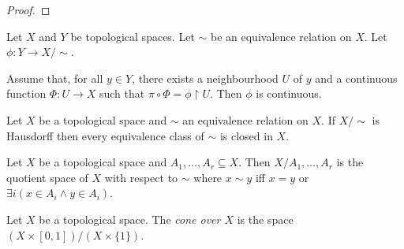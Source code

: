 \begin{proof}
\pf
{}
\end{proof}


\begin{prop}
Let $X$ and $Y$ be topological spaces. Let $\sim$ be an equivalence relation on $X$. Let $\phi : Y \rightarrow X / \sim$.

Assume that, for all $y \in Y$, there exists a neighbourhood $U$ of $y$ and a continuous function $\Phi : U \rightarrow X$ such that $\pi \circ \Phi = \phi \restriction U$. Then $\phi$ is continuous.
\end{prop}

\begin{prop}
Let $X$ be a topological space and $\sim$ an equivalence relation on $X$. If $X / \sim$ is Hausdorff then every equivalence class of $\sim$ is closed in $X$.
\end{prop}

\begin{df}
Let $X$ be a topological space and $A_1, \ldots, A_r \subseteq X$. Then $X / A_1, \ldots, A_r$ is the quotient space of $X$ with respect to $\sim$ where $x \sim y$ iff $x = y$ or $\exists i (x \in A_i \wedge y \in A_i)$.
\end{df}

\begin{df}[Cone]
Let $X$ be a topological space. The \emph{cone over $X$} is the space $(X \times [0,1]) / (X \times \{1\})$.
\end{df}

